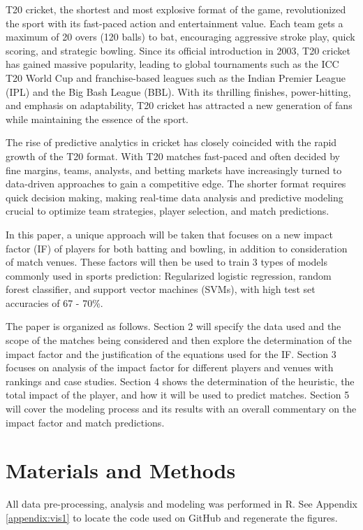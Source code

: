 \documentclass{article}[12pt]
\begin{document}
T20 cricket, the shortest and most explosive format of the game, revolutionized the sport with its fast-paced action and entertainment value. Each team gets a maximum of 20 overs (120 balls) to bat, encouraging aggressive stroke play, quick scoring, and strategic bowling. Since its official introduction in 2003, T20 cricket has gained massive popularity, leading to global tournaments such as the ICC T20 World Cup and franchise-based leagues such as the Indian Premier League (IPL) and the Big Bash League (BBL). With its thrilling finishes, power-hitting, and emphasis on adaptability, T20 cricket has attracted a new generation of fans while maintaining the essence of the sport.

The rise of predictive analytics in cricket has closely coincided with the rapid growth of the T20 format. With T20 matches fast-paced and often decided by fine margins, teams, analysts, and betting markets have increasingly turned to data-driven approaches to gain a competitive edge. The shorter format requires quick decision making, making real-time data analysis and predictive modeling crucial to optimize team strategies, player selection, and match predictions.

In this paper, a unique approach will be taken that focuses on a new impact factor (IF) of players for both batting and bowling, in addition to consideration of match venues. These factors will then be used to train 3 types of models commonly used in sports prediction: Regularized logistic regression, random forest classifier, and support vector machines (SVMs), with high test set accuracies of 67 - 70\%. \parencite{vistro_2019}

The paper is organized as follows. Section 2 will specify the data used and the scope of the matches being considered and then explore the determination of the impact factor and the justification of the equations used for the IF. Section 3 focuses on analysis of the impact factor for different players and venues with rankings and case studies. Section 4 shows the determination of the heuristic, the total impact of the player, and how it will be used to predict matches. Section 5 will cover the modeling process and its results with an overall commentary on the impact factor and match predictions.

\section{Materials and Methods}

All data pre-processing, analysis and modeling was performed in R. \parencite{r_software} See Appendix \ref{appendix:vis1} to locate the code used on GitHub and regenerate the figures.
\end{document}
